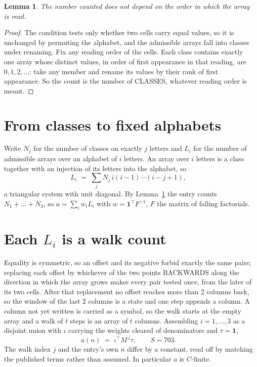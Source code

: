 \documentclass[11pt,a4paper]{article}
\theoremstyle{plain}
\newtheorem{lemma}[theorem]{Lemma}
\theoremstyle{definition}
\begin{document}
\begin{lemma}\label{lem:order}
The number counted does not depend on the order in which the array is read.
\end{lemma}

\begin{proof}
The condition tests only whether two cells carry equal values, so it is unchanged by permuting
the alphabet, and the admissible arrays fall into classes under renaming. Fix any reading order
of the cells. Each class contains exactly one array whose distinct values, in order of first
appearance in that reading, are $0,1,2,\dots$: take any member and rename its values by their
rank of first appearance. So the count is the number of CLASSES, whatever reading order is
meant.
\end{proof}

\section{From classes to fixed alphabets}

Write $N_j$ for the number of classes on exactly $j$ letters and $L_i$ for the number of
admissible arrays over an alphabet of $i$ letters. An array over $i$ letters is a class together
with an injection of its letters into the alphabet, so
\[
L_i\;=\;\sum_j N_j\,i(i-1)\cdots(i-j+1),
\]
a triangular system with unit diagonal. By Lemma~\ref{lem:order} the entry counts
$N_1+\dots+N_{3}$, so $a=\sum_i w_iL_i$ with $w=\mathbf{1}^{\!\top}F^{-1}$, $F$ the
matrix of falling factorials.

\section{Each $L_i$ is a walk count}

Equality is symmetric, so an offset and its negative forbid exactly the same pairs; replacing
each offset by whichever of the two points BACKWARDS along the direction in which the array
grows makes every pair tested once, from the later of its two cells. After that replacement no
offset reaches more than $2$ columns back, so the window of the last $2$
columns is a state and one step appends a column. A column not yet written is
carried as a symbol, so the walk starts at the empty array and a walk of $t$ steps is an array
of $t$ columns. Assembling $i=1,\dots,3$ as a disjoint union with $\iota$ carrying the
weights cleared of denominators and $\tau=\mathbf{1}$,
\[
a(n)\;=\;\iota^{\!\top}M^{\,j}\tau ,\qquad S=703.
\]
The walk index $j$ and the entry's own $n$ differ by a constant, read off by matching the
published terms rather than assumed. In particular $a$ is $C$-finite.
\end{document}
